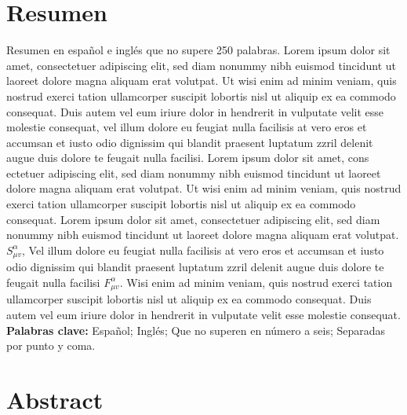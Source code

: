 \documentclass[9pt]{article}
\author[1,*]{\fontsize{9}{9} \orcidlink{0000-0002-0375-1366} \textbf{Autor 1}}
\author[2]{\textbf{ Autor 2}}
\author[1,3]{\textbf{Autor 3}}
\affil[1]{\fontsize{8}{8}Filiación Autor 1, 8pt}
\affil[2]{Filiación Autor 2}
\affil[3]{Filiación Autor 3.}
\begin{document}
\maketitle
\section*{Resumen}
\justifying
Resumen en español e inglés que no supere 250 palabras. Lorem ipsum dolor sit amet, consectetuer adipiscing elit, sed diam nonummy nibh euismod tincidunt ut laoreet dolore magna aliquam erat volutpat. Ut wisi enim ad minim veniam, quis nostrud exerci tation ullamcorper suscipit lobortis nisl ut aliquip ex ea commodo consequat. Duis autem vel eum iriure dolor in hendrerit in vulputate velit esse molestie consequat, vel illum dolore eu feugiat nulla facilisis at vero eros et accumsan et iusto odio dignissim qui blandit praesent luptatum zzril delenit augue duis dolore te feugait nulla facilisi. Lorem ipsum dolor sit amet, cons ectetuer adipiscing elit, sed diam nonummy nibh euismod tincidunt ut laoreet dolore magna aliquam erat volutpat. Ut wisi enim ad minim veniam, quis nostrud exerci tation ullamcorper suscipit lobortis nisl ut aliquip ex ea commodo consequat. Lorem ipsum dolor sit amet, consectetuer adipiscing elit, sed diam nonummy nibh euismod tincidunt ut laoreet dolore magna aliquam erat volutpat. $S^{\alpha}_{\mu v}$, Vel illum dolore eu feugiat nulla facilisis at vero eros et accumsan et iusto odio dignissim qui blandit praesent luptatum zzril delenit augue duis dolore te feugait nulla facilisi $F^{\alpha}_{\mu v}$. Wisi enim ad minim veniam, quis nostrud exerci tation ullamcorper suscipit lobortis nisl ut aliquip ex ea commodo consequat. Duis autem vel eum iriure dolor in hendrerit in vulputate velit esse molestie consequat.\\[0.2cm]
\textbf{Palabras clave:} Español; Inglés; Que no superen en número a seis; Separadas por punto y coma. 


\section*{Abstract}
\end{document}
